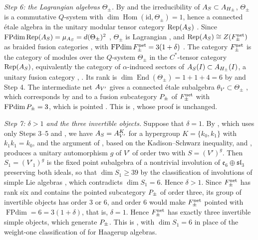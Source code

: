 \documentclass[leqno]{article}
\let\cal\relax
\newcommand{\cal}{\mathcal}
\renewcommand{\geq}{\ensuremath{\geqslant}}
\DeclareMathOperator{\Rep}{Rep}
\numberwithin{equation}{section}
\begin{document}
\emph{Step 6: the Lagrangian algebras $\Theta_\pm$.} By \cite[Proposition 2.5(3)]{ArhII} and the irreducibility of $\cal A_S \subset \cal A_{H_\pm}$, $\Theta_\pm$ is a commutative $Q$-system with $\dim\operatorname{Hom}(\mathrm{id},\Theta_\pm) = 1$, hence a connected étale algebra in the unitary modular tensor category $\Rep(\cal A_S)$ \cite[Theorem 33 and Corollary 39]{KLM01}. Since $\operatorname{FPdim}\Rep(\cal A_S) = \mu_{\cal A_S} = d(\Theta_\pm)^2$ \cite[Theorem 33]{KLM01}, $\Theta_\pm$ is Lagrangian \cite[Definition 4.6]{DMNO13}, and $\Rep(\cal A_S) \cong Z(\cal F^{\mathrm{net}}_\pm)$ as braided fusion categories \cite[Corollary 4.1]{DMNO13}, with $\operatorname{FPdim}\cal F^{\mathrm{net}}_\pm = 3(1+\delta)$ \cite[Lemma 3.11]{DMNO13}. The category $\cal F^{\mathrm{net}}_\pm$ is the category of modules over the $Q$-system $\Theta_\pm$ in the $C^*$-tensor category $\Rep(\cal A_S)$, equivalently the category of $\alpha$-induced sectors of $\cal A_S(I) \subset \cal A_{H_\pm}(I)$, a unitary fusion category \cite[Section 4.6]{BKLR15}, \cite[Proposition 4.5]{Bis17a}. Its rank is $\dim\operatorname{End}(\Theta_\pm) = 1+1+4 = 6$ by \cite[Lemma 3.1]{ArhII} and Step 4. The intermediate net $\cal A_{V'}$ gives a connected étale subalgebra $\theta_{V'} \subset \Theta_\pm$ \cite[Proposition 4.11]{BKLR15}, which corresponds by \cite[Lemma 3.1]{ArhII} and \cite[Theorem 4.10]{DMNO13} to a fusion subcategory $\cal P_\pm$ of $\cal F^{\mathrm{net}}_\pm$ with $\operatorname{FPdim}\cal P_\pm = 3$, which is pointed \cite[Corollary 8.30]{ENO05}. This is \cite[Theorem 5.6(4)]{ArhII}, whose proof is unchanged.

\emph{Step 7: $\delta > 1$ and the three invertible objects.} Suppose that $\delta = 1$. By \cite[Proposition 5.7]{ArhII}, which uses only Steps 3--5 and \cite[Theorem 4.22 and Section 4.6]{Bis17b}, we have $\cal A_S = \cal A_{V'}^K$ for a hypergroup $K = \{k_0,k_1\}$ with $k_1k_1 = k_0$, and the argument of \cite[Proposition 5.8]{ArhII}, based on the Kadison--Schwarz inequality, \cite[Proposition 4.21]{Bis17b} and \cite[Theorem 6.9, Theorem 7.5 and Proposition 7.6]{CKLW18}, produces a unitary automorphism $g$ of $V'$ of order two with $S = (V')^g$. Then $S_1 = (V'_1)^g$ is the fixed point subalgebra of a nontrivial involution of $\mathfrak e_6 \oplus \mathfrak{sl}_3$ preserving both ideals, so that $\dim S_1 \geq 39$ by the classification of involutions of simple Lie algebras \cite[Chapter X]{Hel78}, which contradicts $\dim S_1 = 6$. Hence $\delta > 1$. Since $\cal F^{\mathrm{net}}_\pm$ has rank six and contains the pointed subcategory $\cal P_\pm$ of order three, its group of invertible objects has order $3$ or $6$, and order $6$ would make $\cal F^{\mathrm{net}}_\pm$ pointed with $\operatorname{FPdim} = 6 = 3(1+\delta)$, that is, $\delta = 1$. Hence $\cal F^{\mathrm{net}}_\pm$ has exactly three invertible simple objects, which generate $\cal P_\pm$. This is \cite[Proposition 5.8]{ArhII}, with $\dim S_1 = 6$ in place of the weight-one classification of \cite{Arh26} for Haagerup algebras.
\end{document}
